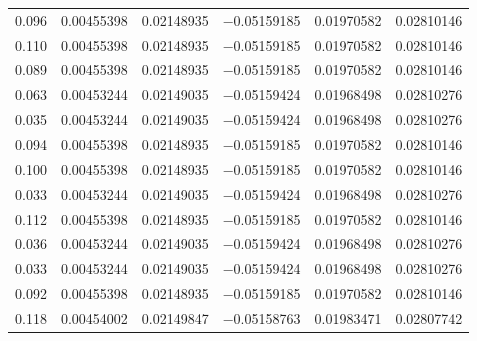 \begin{table}[p]
\begin{tabularx}{\textwidth}{l *{5}{C}}
        \NormalEmbedding{} \num{0.096} & \num{0.00455398} & \num{0.02148935} & \num{-0.05159185} & \num{0.01970582} & \num{0.02810146} \\
        \NormalEmbedding{} \num{0.110} & \num{0.00455398} & \num{0.02148935} & \num{-0.05159185} & \num{0.01970582} & \num{0.02810146} \\
        \NormalEmbedding{} \num{0.089} & \num{0.00455398} & \num{0.02148935} & \num{-0.05159185} & \num{0.01970582} & \num{0.02810146} \\
        \FastEmbedding{} \num{0.063} & \num{0.00453244} & \num{0.02149035} & \num{-0.05159424} & \num{0.01968498} & \num{0.02810276} \\
        \FastEmbedding{} \num{0.035} & \num{0.00453244} & \num{0.02149035} & \num{-0.05159424} & \num{0.01968498} & \num{0.02810276} \\
        \NormalEmbedding{} \num{0.094} & \num{0.00455398} & \num{0.02148935} & \num{-0.05159185} & \num{0.01970582} & \num{0.02810146} \\
        \NormalEmbedding{} \num{0.100} & \num{0.00455398} & \num{0.02148935} & \num{-0.05159185} & \num{0.01970582} & \num{0.02810146} \\
        \FastEmbedding{} \num{0.033} & \num{0.00453244} & \num{0.02149035} & \num{-0.05159424} & \num{0.01968498} & \num{0.02810276} \\
        \NormalEmbedding{} \num{0.112} & \num{0.00455398} & \num{0.02148935} & \num{-0.05159185} & \num{0.01970582} & \num{0.02810146} \\
        \FastEmbedding{} \num{0.036} & \num{0.00453244} & \num{0.02149035} & \num{-0.05159424} & \num{0.01968498} & \num{0.02810276} \\
        \FastEmbedding{} \num{0.033} & \num{0.00453244} & \num{0.02149035} & \num{-0.05159424} & \num{0.01968498} & \num{0.02810276} \\
        \NormalEmbedding{} \num{0.092} & \num{0.00455398} & \num{0.02148935} & \num{-0.05159185} & \num{0.01970582} & \num{0.02810146} \\
        \OtherEmbedding{} \num{0.118} & \num{0.00454002} & \num{0.02149847} & \num{-0.05158763} & \num{0.01983471} & \num{0.02807742} \\
        \bottomrule
    \end{tabularx}
\end{table}

